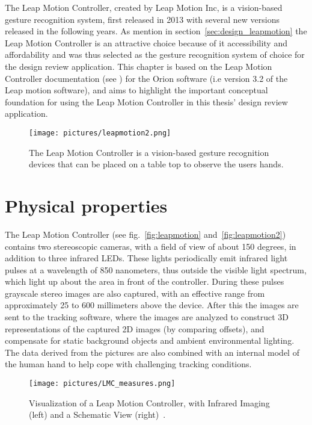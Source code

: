 The Leap Motion Controller, created by Leap Motion Inc, is a vision-based gesture recognition system, first released in 2013 with several new versions released in the following
years. As mention in section~\vref{sec:design_leapmotion} the Leap Motion Controller is an attractive choice because of it accessibility and affordability and was thus 
selected as the gesture recognition system of choice for the design review application. 
This chapter is based on the Leap Motion Controller documentation (see \citet{LeapMotion2016}) for the Orion software (i.e version 3.2 of the Leap motion software), 
and aims to highlight the important conceptual foundation for using the Leap Motion Controller in this thesis' design review application.

\begin{figure}%
	\texttt{[image: pictures/leapmotion2.png]}
	\caption[The Leap Motion Controller]{The Leap Motion Controller is a vision-based gesture recognition devices that can be placed on a table top to observe the users hands.}
	\label{fig:leapmotion}
\end{figure} 

\section{Physical properties}
The Leap Motion Controller (see fig.~\vref{fig:leapmotion} and~\vref{fig:leapmotion2}) contains two stereoscopic cameras, with a field of view of about 150 degrees, 
in addition to three infrared LEDs. 
These lights periodically emit infrared light pulses at a wavelength of 850 nanometers, thus outside the visible light spectrum, which light up about the 
area in front of the controller. During these pulses grayscale stereo images are also captured, with an effective range from approximately 25 to 600 millimeters above the device.
After this the images are sent to the tracking software, where the images are analyzed to construct 3D representations of the captured 2D images (by comparing offsets), and
compensate for static background objects and ambient environmental lighting. 
The data derived from the pictures are also combined with an internal model of the human hand to help cope with challenging tracking conditions.

\begin{figure}%
	\texttt{[image: pictures/LMC\_measures.png]}
	\caption[Visualization of a Leap Motion Controller]{Visualization of a Leap Motion Controller, with Infrared Imaging (left) and a Schematic View (right)~\citep{Weichert2013}.}
	\label{fig:leapmotion2}
\end{figure} 

